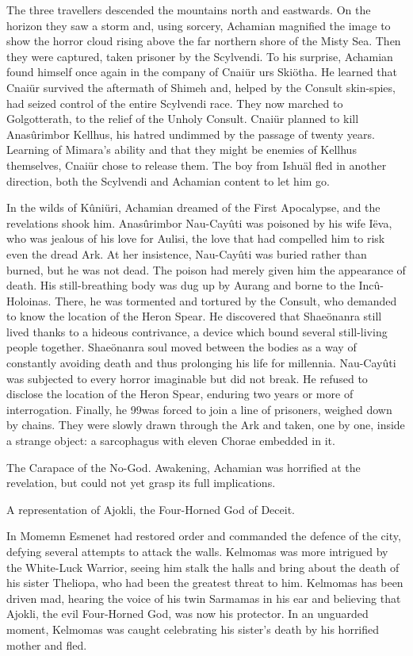 \documentclass[]{book}
\begin{document}
The three travellers descended the mountains north and eastwards. On the horizon
they saw a storm and, using sorcery, Achamian magnified the image to show the horror
cloud rising above the far northern shore of the Misty Sea. Then they were captured,
taken prisoner by the Scylvendi. To his surprise, Achamian found himself once again in
the company of Cnaiür urs Skiötha. He learned that Cnaiür survived the aftermath of
Shimeh and, helped by the Consult skin-spies, had seized control of the entire
Scylvendi race. They now marched to Golgotterath, to the relief of the Unholy Consult.
Cnaiür planned to kill Anasûrimbor Kellhus, his hatred undimmed by the passage of
twenty years. Learning of Mimara's ability and that they might be enemies of Kellhus
themselves, Cnaiür chose to release them. The boy from Ishuäl fled in another
direction, both the Scylvendi and Achamian content to let him go.

In the wilds of Kûniüri, Achamian dreamed of the First Apocalypse, and the revelations
shook him. Anasûrimbor Nau-Cayûti was poisoned by his wife Iëva, who was jealous of
his love for Aulisi, the love that had compelled him to risk even the dread Ark. At her
insistence, Nau-Cayûti was buried rather than burned, but he was not dead. The poison
had merely given him the appearance of death. His still-breathing body was dug up by
Aurang and borne to the Incû-Holoinas. There, he was tormented and tortured by the
Consult, who demanded to know the location of the Heron Spear. He discovered that
Shaeönanra still lived thanks to a hideous contrivance, a device which bound several
still-living people together. Shaeönanra soul moved between the bodies as a way of
constantly avoiding death and thus prolonging his life for millennia. Nau-Cayûti was
subjected to every horror imaginable but did not break. He refused to disclose the
location of the Heron Spear, enduring two years or more of interrogation. Finally, he
99was forced to join a line of prisoners, weighed down by chains. They were slowly drawn
through the Ark and taken, one by one, inside a strange object: a sarcophagus with
eleven Chorae embedded in it.

The Carapace of the No-God. Awakening, Achamian was horrified at the revelation,
but could not yet grasp its full implications.

A representation of Ajokli, the Four-Horned God of Deceit.

In Momemn Esmenet had restored order and commanded the defence of the city,
defying several attempts to attack the walls. Kelmomas was more intrigued by the
White-Luck Warrior, seeing him stalk the halls and bring about the death of his sister
Theliopa, who had been the greatest threat to him. Kelmomas has been driven mad,
hearing the voice of his twin Sarmamas in his ear and believing that Ajokli, the evil
Four-Horned God, was now his protector. In an unguarded moment, Kelmomas was
caught celebrating his sister's death by his horrified mother and fled.
\end{document}
